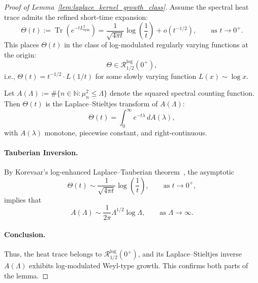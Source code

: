 \begin{proof}[Proof of Lemma~\ref{lem:laplace_kernel_growth_class}]
Assume the spectral heat trace admits the refined short-time expansion:
\[
\Theta(t) := \operatorname{Tr}(e^{-t L_{\mathrm{sym}}^2}) = \frac{1}{\sqrt{4\pi t}} \log\left( \frac{1}{t} \right) + o(t^{-1/2}), \qquad \text{as } t \to 0^+.
\]
This places \( \Theta(t) \) in the class of log-modulated regularly varying functions at the origin:
\[
\Theta \in \mathcal{R}_{1/2}^{\log}(0^+),
\]
i.e., \( \Theta(t) = t^{-1/2} \cdot L(1/t) \) for some slowly varying function \( L(x) \sim \log x \).

Let \( A(\Lambda) := \#\{ n \in \mathbb{N} : \mu_n^2 \le \Lambda \} \) denote the squared spectral counting function. Then \( \Theta(t) \) is the Laplace–Stieltjes transform of \( A(\Lambda) \):
\[
\Theta(t) = \int_0^\infty e^{-t \lambda} \, dA(\lambda),
\]
with \( A(\lambda) \) monotone, piecewise constant, and right-continuous.

\paragraph{Tauberian Inversion.}
By Korevaar’s log-enhanced Laplace–Tauberian theorem~\cite[Ch.~III, Thm.~5.5]{Korevaar2004Tauberian}, the asymptotic
\[
\Theta(t) \sim \frac{1}{\sqrt{4\pi t}} \log\left( \frac{1}{t} \right), \qquad \text{as } t \to 0^+,
\]
implies that
\[
A(\Lambda) \sim \frac{1}{2\pi} \Lambda^{1/2} \log \Lambda, \qquad \text{as } \Lambda \to \infty.
\]

\paragraph{Conclusion.}
Thus, the heat trace belongs to \( \mathcal{R}_{1/2}^{\log}(0^+) \), and its Laplace–Stieltjes inverse \( A(\Lambda) \) exhibits log-modulated Weyl-type growth. This confirms both parts of the lemma.
\end{proof}
